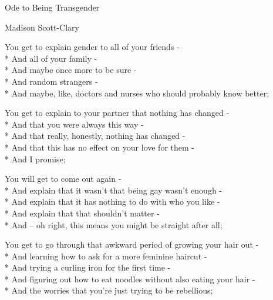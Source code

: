 \documentclass[12pt,letterpaper,oneside]{memoir}
\begin{document}
  \pagestyle{empty}
  \begin{center}
    Ode to Being Transgender

    Madison Scott-Clary
  \end{center}

  \vspace{1pc}
  \noindent
  You get to explain gender to all of your friends -\\*
  \hspace*{0.25cm} And all of your family -\\*
  \hspace*{0.25cm} And maybe once more to be sure -\\*
  \hspace*{0.25cm} And random strangers -\\*
  \hspace*{0.25cm} And maybe, like, doctors and nurses who should probably know better;

  \vspace{1pc}
  \noindent
  You get to explain to your partner that nothing has changed -\\*
  \hspace*{0.25cm} And that you were always this way -\\*
  \hspace*{0.25cm} And that really, honestly, nothing has changed -\\*
  \hspace*{0.25cm} And that this has no effect on your love for them -\\*
  \hspace*{0.25cm} And I promise;

  \vspace{1pc}
  \noindent
  You will get to come out again -\\*
  \hspace*{0.25cm} And explain that it wasn't that being gay wasn't enough -\\*
  \hspace*{0.25cm} And explain that it has nothing to do with who you like -\\*
  \hspace*{0.25cm} And explain that that shouldn't matter -\\*
  \hspace*{0.25cm} And -- oh right, this means you might be straight after all;

  \vspace{1pc}
  \noindent
  You get to go through that awkward period of growing your hair out -\\*
  \hspace*{0.25cm} And learning how to ask for a more feminine haircut -\\*
  \hspace*{0.25cm} And trying a curling iron for the first time -\\*
  \hspace*{0.25cm} And figuring out how to eat noodles without also eating your hair -\\*
  \hspace*{0.25cm} And the worries that you're just trying to be rebellious;
\end{document}
